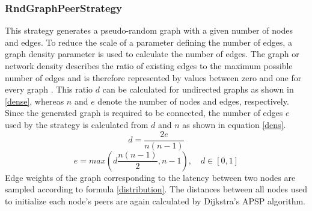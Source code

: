 \documentclass[a4paper,12pt,twoside]{report}
\begin{document}
\subsubsection{RndGraphPeerStrategy} \label{rndgraphstrategy}
This strategy generates a pseudo-random graph with a given number of nodes and edges. To reduce the scale of a parameter defining the number of edges, a graph density parameter is used to calculate the number of edges. The graph or network density describes the ratio of existing edges to the maximum possible number of edges and is therefore represented by values between zero and one for every graph \cite{density}. This ratio $d$ can be calculated for undirected graphs as shown in \autoref{dense}, whereas $n$ and $e$ denote the number of nodes and edges, respectively. Since the generated graph is required to be connected, the number of edges $e$ used by the strategy is calculated from $d$ and $n$ as shown in equation \ref{dens}. 
\begin{equation}\label{dense}
d = \frac{2e}{n\left( n-1\right) }
\end{equation}
\begin{equation}\label{dens}
e = max \left( d\frac{n\left( n-1\right) }{2}, n-1 \right),\quad d\in [0,1]
\end{equation}
Edge weights of the graph corresponding to the latency between two nodes are sampled according to formula \ref{distribution}. The distances between all nodes used to initialize each node's peers are again calculated by Dijkstra's APSP algorithm. 
\end{document}
